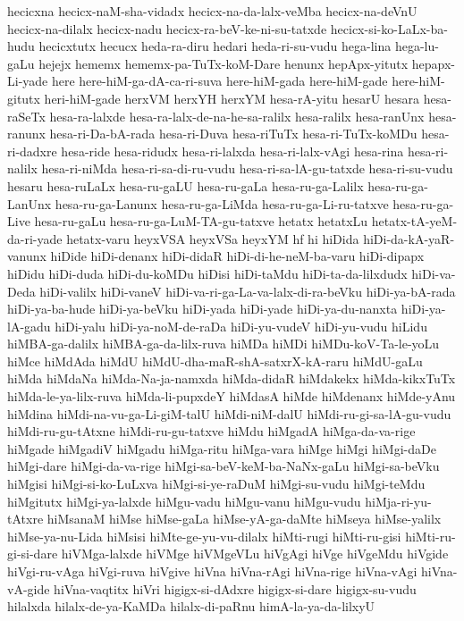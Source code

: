 {hecicxna
hecicx-naM-sha-vidadx
hecicx-na-da-lalx-veMba
hecicx-na-deVnU
hecicx-na-dilalx
hecicx-nadu
hecicx-ra-beV-ke-ni-su-tatxde
hecicx-si-ko-LaLx-ba-hudu
hecicxtutx
hecucx
heda-ra-diru
hedari
heda-ri-su-vudu
hega-lina
hega-lu-gaLu
hejejx
hememx
hememx-pa-TuTx-koM-Dare
henunx
hepApx-yitutx
hepapx-Li-yade
here
here-hiM-ga-dA-ca-ri-suva
here-hiM-gada
here-hiM-gade
here-hiM-gitutx
heri-hiM-gade
herxVM
herxYH
herxYM
hesa-rA-yitu
hesarU
hesara
hesa-raSeTx
hesa-ra-lalxde
hesa-ra-lalx-de-na-he-sa-ralilx
hesa-ralilx
hesa-ranUnx
hesa-ranunx
hesa-ri-Da-bA-rada
hesa-ri-Duva
hesa-riTuTx
hesa-ri-TuTx-koMDu
hesa-ri-dadxre
hesa-ride
hesa-ridudx
hesa-ri-lalxda
hesa-ri-lalx-vAgi
hesa-rina
hesa-ri-nalilx
hesa-ri-niMda
hesa-ri-sa-di-ru-vudu
hesa-ri-sa-lA-gu-tatxde
hesa-ri-su-vudu
hesaru
hesa-ruLaLx
hesa-ru-gaLU
hesa-ru-gaLa
hesa-ru-ga-Lalilx
hesa-ru-ga-LanUnx
hesa-ru-ga-Lanunx
hesa-ru-ga-LiMda
hesa-ru-ga-Li-ru-tatxve
hesa-ru-ga-Live
hesa-ru-gaLu
hesa-ru-ga-LuM-TA-gu-tatxve
hetatx
hetatxLu
hetatx-tA-yeM-da-ri-yade
hetatx-varu
heyxVSA
heyxVSa
heyxYM
hf
hi
hiDida
hiDi-da-kA-yaR-vanunx
hiDide
hiDi-denanx
hiDi-didaR
hiDi-di-he-neM-ba-varu
hiDi-dipapx
hiDidu
hiDi-duda
hiDi-du-koMDu
hiDisi
hiDi-taMdu
hiDi-ta-da-lilxdudx
hiDi-va-Deda
hiDi-valilx
hiDi-vaneV
hiDi-va-ri-ga-La-va-lalx-di-ra-beVku
hiDi-ya-bA-rada
hiDi-ya-ba-hude
hiDi-ya-beVku
hiDi-yada
hiDi-yade
hiDi-ya-du-nanxta
hiDi-ya-lA-gadu
hiDi-yalu
hiDi-ya-noM-de-raDa
hiDi-yu-vudeV
hiDi-yu-vudu
hiLidu
hiMBA-ga-dalilx
hiMBA-ga-da-lilx-ruva
hiMDa
hiMDi
hiMDu-koV-Ta-le-yoLu
hiMce
hiMdAda
hiMdU
hiMdU-dha-maR-shA-satxrX-kA-raru
hiMdU-gaLu
hiMda
hiMdaNa
hiMda-Na-ja-namxda
hiMda-didaR
hiMdakekx
hiMda-kikxTuTx
hiMda-le-ya-lilx-ruva
hiMda-li-pupxdeY
hiMdasA
hiMde
hiMdenanx
hiMde-yAnu
hiMdina
hiMdi-na-vu-ga-Li-giM-talU
hiMdi-niM-dalU
hiMdi-ru-gi-sa-lA-gu-vudu
hiMdi-ru-gu-tAtxne
hiMdi-ru-gu-tatxve
hiMdu
hiMgadA
hiMga-da-va-rige
hiMgade
hiMgadiV
hiMgadu
hiMga-ritu
hiMga-vara
hiMge
hiMgi
hiMgi-daDe
hiMgi-dare
hiMgi-da-va-rige
hiMgi-sa-beV-keM-ba-NaNx-gaLu
hiMgi-sa-beVku
hiMgisi
hiMgi-si-ko-LuLxva
hiMgi-si-ye-raDuM
hiMgi-su-vudu
hiMgi-teMdu
hiMgitutx
hiMgi-ya-lalxde
hiMgu-vadu
hiMgu-vanu
hiMgu-vudu
hiMja-ri-yu-tAtxre
hiMsanaM
hiMse
hiMse-gaLa
hiMse-yA-ga-daMte
hiMseya
hiMse-yalilx
hiMse-ya-nu-Lida
hiMsisi
hiMte-ge-yu-vu-dilalx
hiMti-rugi
hiMti-ru-gisi
hiMti-ru-gi-si-dare
hiVMga-lalxde
hiVMge
hiVMgeVLu
hiVgAgi
hiVge
hiVgeMdu
hiVgide
hiVgi-ru-vAga
hiVgi-ruva
hiVgive
hiVna
hiVna-rAgi
hiVna-rige
hiVna-vAgi
hiVna-vA-gide
hiVna-vaqtitx
hiVri
higigx-si-dAdxre
higigx-si-dare
higigx-su-vudu
hilalxda
hilalx-de-ya-KaMDa
hilalx-di-paRnu
himA-la-ya-da-lilxyU
}

